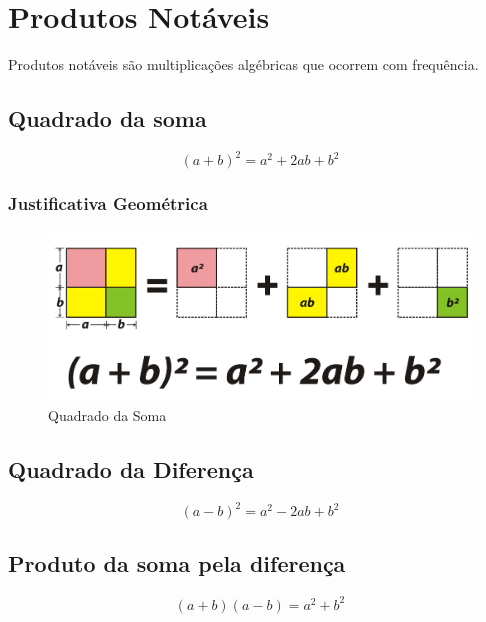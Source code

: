 \chapter{Produtos Notáveis}

Produtos notáveis são multiplicações algébricas que ocorrem com frequência. 

\section{Quadrado da soma}

\begin{equation}
(a+b)^2=a^2+2ab+b^2
\end{equation}

\subsection{Justificativa Geométrica}
\begin{figure}[h]
    \centering
    \includegraphics[scale=1]{./imagens/12.png}
    \caption{Quadrado da Soma}
    \label{fig:my_label}
\end{figure}

\section{Quadrado da Diferença}

\begin{equation}
(a-b)^2=a^2-2ab+b^2
\end{equation}

\section{Produto da soma pela diferença}

\begin{equation}
(a+b)(a-b)=a^2+b^2
\end{equation}

